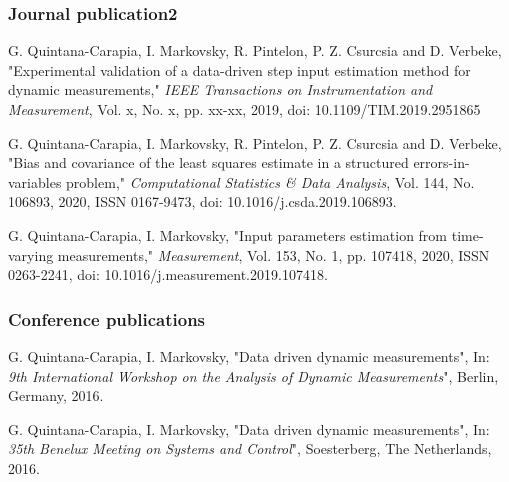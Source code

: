 

\subsubsection*{Journal publication2}

\noindent G. Quintana-Carapia, I. Markovsky, R. Pintelon, P. Z. Csurcsia and D. Verbeke, "Experimental validation of a data-driven step input estimation method for dynamic measurements," \textit{IEEE Transactions on Instrumentation and Measurement}, Vol. x, No. x, pp. xx-xx, 2019, doi: 10.1109/TIM.2019.2951865

\vspace{0.2cm}

\noindent G. Quintana-Carapia, I. Markovsky, R. Pintelon, P. Z. Csurcsia and D. Verbeke, "Bias and covariance of the least squares estimate in a structured errors-in-variables problem," \textit{Computational Statistics & Data Analysis}, Vol. 144, No. 106893, 2020, ISSN 0167-9473, doi: 10.1016/j.csda.2019.106893.


\vspace{0.2cm}
\noindent G. Quintana-Carapia, I. Markovsky, "Input parameters estimation from time-varying measurements," \textit{Measurement}, Vol. 153, No. 1, pp. 107418, 2020, ISSN 0263-2241, doi: 10.1016/j.measurement.2019.107418.
 

\vspace{0.2cm}
\subsubsection*{Conference publications}

\noindent G. Quintana-Carapia, I. Markovsky, "Data driven dynamic measurements",
In: \textit{9th International Workshop on the Analysis of Dynamic Measurements}", Berlin, Germany, 2016.

\vspace{0.2cm}

\noindent G. Quintana-Carapia, I. Markovsky, "Data driven dynamic measurements",
In: \textit{35th Benelux Meeting on Systems and Control}", Soesterberg, The Netherlands, 2016.


